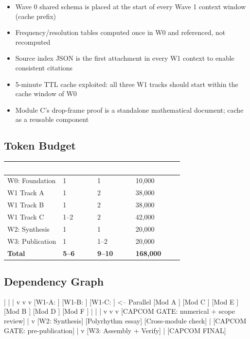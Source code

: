 \documentclass[11pt,letterpaper]{article}
\newcommand{\tableheader}[1]{\textbf{\sffamily\textcolor{white}{#1}}}
\begin{document}
\begin{itemize}[leftmargin=*]
  \item Wave 0 shared schema is placed at the start of every Wave 1 context window (cache prefix)
  \item Frequency/resolution tables computed once in W0 and referenced, not recomputed
  \item Source index JSON is the first attachment in every W1 context to enable consistent citations
  \item 5-minute TTL cache exploited: all three W1 tracks should start within the cache window of W0
  \item Module C's drop-frame proof is a standalone mathematical document; cache as a reusable component
\end{itemize}

\subsection{Token Budget}

\begin{center}
\begin{tabularx}{\textwidth}{L{3cm}C{2cm}C{2cm}C{2.5cm}}
\toprule
{}
\tableheader{Wave} & \tableheader{Sessions} & \tableheader{Windows} & \tableheader{Est.\ Tokens} \\
\midrule
W0: Foundation & 1 & 1 & 10,000 \\
W1 Track A & 1 & 2 & 38,000 \\
W1 Track B & 1 & 2 & 38,000 \\
W1 Track C & 1--2 & 2 & 42,000 \\
W2: Synthesis & 1 & 1 & 20,000 \\
W3: Publication & 1 & 1--2 & 20,000 \\
\midrule
\textbf{Total} & \textbf{5--6} & \textbf{9--10} & \textbf{168,000} \\
\bottomrule
\end{tabularx}
\end{center}

\subsection{Dependency Graph}

\begin{asciibox}
        |        |        |
        v        v        v
  [W1-A:  ] [W1-B:  ] [W1-C:  ]     <-- Parallel
  [Mod A  ] [Mod C  ] [Mod E  ]
  [Mod B  ] [Mod D  ] [Mod F  ]
        |        |        |
        v        v        v
  [CAPCOM GATE: numerical + scope review]
                 |
                 v
         [W2: Synthesis]
         [Polyrhythm essay]
         [Cross-module check]
                 |
         [CAPCOM GATE: pre-publication]
                 |
                 v
         [W3: Assembly + Verify]
                 |
         [CAPCOM FINAL]
\end{asciibox}
\end{document}
